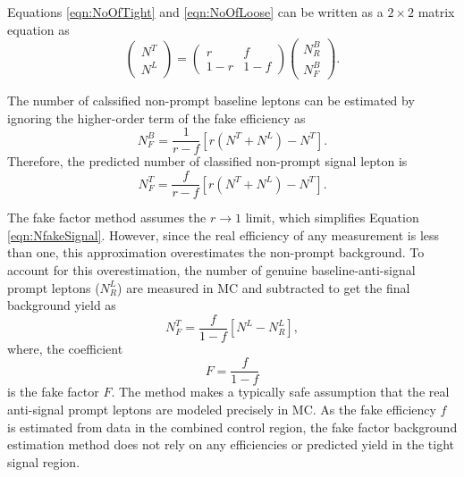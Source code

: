 Equations \ref{eqn:NoOfTight} and \ref{eqn:NoOfLoose} can be written as a $2 \times 2$ matrix equation as
\begin{equation}
    \begin{pmatrix} N^{T} \\ N^{L} \end{pmatrix} =  \begin{pmatrix} r & f \\ 1-r & 1-f \end{pmatrix} \begin{pmatrix} N^{B}_{R} \\ N^{B}_{F}\end{pmatrix}.
    \label{eqn:RealFakeLepton}
\end{equation}

The number of calssified non-prompt baseline leptons can be estimated by ignoring the higher-order term of the fake efficiency as
\begin{equation}
    N_{F}^{B} =  \frac{1}{r-f}[r(N^{T}+N^{L})-N^{T}].
    \label{eqn:NfakeBaseline}
\end{equation}
Therefore, the predicted number of classified non-prompt signal lepton is 
\begin{equation}
    N_{F}^{T} =  \frac{f}{r-f}[r(N^{T}+N^{L})-N^{T}].
\label{eqn:NfakeSignal}
\end{equation}

The fake factor method assumes the $r\rightarrow 1$ limit, which simplifies Equation \ref{eqn:NfakeSignal}. However, since the real efficiency of any measurement is less than one, this approximation overestimates the non-prompt background. To account for this overestimation, the number of genuine baseline-anti-signal prompt leptons ($N^{L}_{R}$) are measured in MC and subtracted to get the final background yield as 
\begin{equation}
    N_{F}^{T} =  \frac{f}{1-f}[N^{L}-N^{L}_{R}],
\label{eqn:NfakeSignalFinal}
\end{equation}
where, the coefficient \begin{equation} F=\frac{f}{1-f} \label{eqn:FakeFactor}
\end{equation} is the fake factor $F$. The method makes a typically safe assumption that the real anti-signal prompt leptons are modeled precisely in MC. As the fake efficiency $f$ is estimated from data in the combined control region, the fake factor background estimation method does not rely on any efficiencies or predicted yield in the tight signal region.

